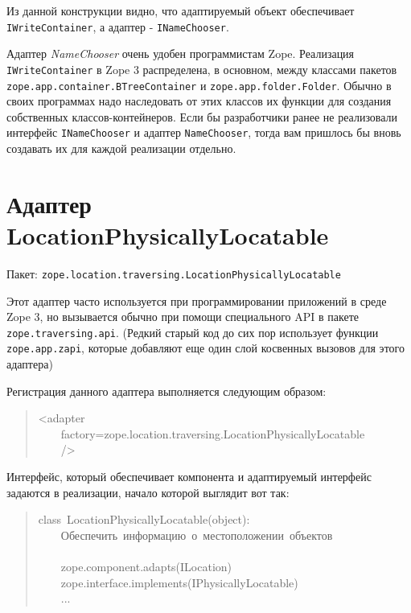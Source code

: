 \documentclass[14pt,a4paper,openany,twoside,final]{extbook}
\providecommand*{\DUroletitlereference}[1]{\textsl{#1}}
\begin{document}
Из данной конструкции видно, что адаптируемый объект обеспечивает
\texttt{IWriteContainer}, а адаптер - \texttt{INameChooser}.

Адаптер \DUroletitlereference{NameChooser} очень удобен программистам Zope.  Реализация
\texttt{IWriteContainer} в Zope 3 распределена, в основном, между классами
пакетов \texttt{zope.app.container.BTreeContainer} и
\texttt{zope.app.folder.Folder}.  Обычно в своих программах надо
наследовать от этих классов их функции для создания собственных
классов-контейнеров.  Если бы разработчики ранее не реализовали
интерфейс \texttt{INameChooser} и адаптер \texttt{NameChooser}, тогда вам
пришлось бы вновь создавать их для каждой реализации отдельно.


\section{Адаптер LocationPhysicallyLocatable%
  \label{locationphysicallylocatable}%
}

Пакет: \texttt{zope.location.traversing.LocationPhysicallyLocatable}

Этот адаптер часто используется при программировании приложений в
среде Zope 3, но вызывается обычно при помощи специального API в
пакете \texttt{zope.traversing.api}.  (Редкий старый код до сих пор
использует функции \texttt{zope.app.zapi}, которые добавляют еще один слой
косвенных вызовов для этого адаптера)

Регистрация данного адаптера выполняется следующим образом:

\begin{quote}{\ttfamily \raggedright \noindent
<adapter\\
~~~~factory=\textquotedbl{}zope.location.traversing.LocationPhysicallyLocatable\textquotedbl{}\\
~~~~/>
}
\end{quote}

Интерфейс, который обеспечивает компонента и адаптируемый интерфейс
задаются в реализации, начало которой выглядит вот так:

\begin{quote}{\ttfamily \raggedright \noindent
class~LocationPhysicallyLocatable(object):\\
~~~~\textquotedbl{}\textquotedbl{}\textquotedbl{}Обеспечить~информацию~о~местоположении~объектов\\
~~~~\textquotedbl{}\textquotedbl{}\textquotedbl{}\\
~~~~zope.component.adapts(ILocation)\\
~~~~zope.interface.implements(IPhysicallyLocatable)\\
~~~~...
}
\end{quote}
\end{document}
